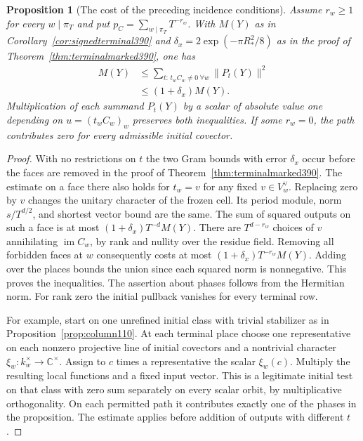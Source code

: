 \documentclass[a4paper,11pt]{article}
\newtheorem{proposition}{Proposition}[section]
\theoremstyle{definition}
\theoremstyle{remark}
\numberwithin{equation}{section}
\begin{document}
\begin{proposition}[The cost of the preceding incidence conditions]
\label{prop:incidencenorm391}
Assume \(r_w\ge1\) for every \(w\mid\pi_T\) and put
\(p_C=\sum_{w\mid\pi_T}T^{-r_w}\). With \(M(Y)\) as in
Corollary~\ref{cor:signedterminal390} and
\(\delta_x=2\exp(-\pi R_*^2/8)\) as in the proof of
Theorem~\ref{thm:terminalmarked390}, one has
\begin{align*}
 [1-\delta_x-(1+\delta_x)p_C] M(Y)
   &\le\sum_{t:\, t_w C_w\ne0\ \forall w}\|P_t(Y)\|^2\\
   &\le (1+\delta_x)M(Y).
\end{align*}
Multiplication of each summand \(P_t(Y)\) by a scalar of
absolute value one depending on \(u=(t_wC_w)_w\) preserves
both inequalities. If some \(r_w=0\), the path contributes
zero for every admissible initial covector.
\end{proposition}
\begin{proof}
With no restrictions on \(t\) the two Gram bounds with error
\(\delta_x\) occur before the faces are removed in the proof of
Theorem~\ref{thm:terminalmarked390}. The estimate on a face
there also holds for \(t_w=v\) for any fixed \(v\in V_w^\vee\).
Replacing zero by \(v\) changes the unitary character of the
frozen cell. Its period module, norm \(s/T^{d/2}\), and shortest
vector bound are the same. The sum of squared outputs on such
a face is at most \((1+\delta_x)T^{-d}M(Y)\).
There are \(T^{d-r_w}\) choices of \(v\) annihilating
\(\operatorname{im}C_w\), by rank and nullity over the residue
field. Removing all forbidden faces at \(w\) consequently costs
at most \((1+\delta_x)T^{-r_w}M(Y)\). Adding over the places
bounds the union since each squared norm is nonnegative. This
proves the inequalities. The assertion about phases follows
from the Hermitian norm. For rank zero the initial pullback
vanishes for every terminal row.

For example, start on one unrefined initial class with trivial
stabilizer as in Proposition~\ref{prop:column110}. At each
terminal place choose one representative on each nonzero
projective line of initial covectors and a nontrivial character
\(\xi_w:k_w^\times\to\mathbb C^\times\). Assign to
\(c\) times a representative the scalar \(\xi_w(c)\).
Multiply the resulting local functions and a fixed input
vector. This is a legitimate initial test on that class with
zero sum separately on every scalar orbit, by multiplicative
orthogonality. On each permitted path it contributes exactly
one of the phases in the proposition. The estimate applies
before addition of outputs with different \(t\).
\end{proof}
\end{document}
